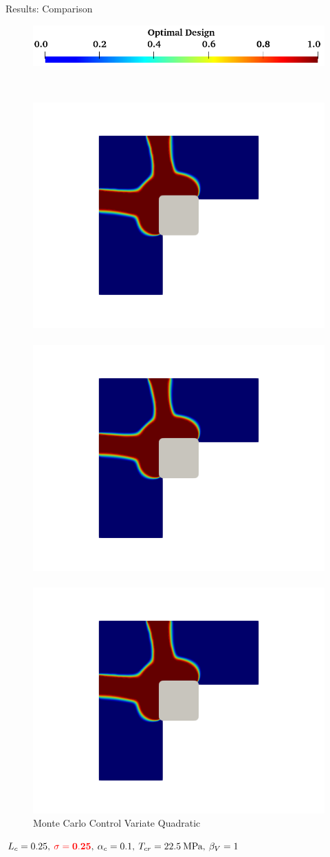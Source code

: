 \documentclass[10pt,xcolor=dvipsnames,compress]{beamer}
\begin{document}
\begin{frame}{Results: Comparison}
\begin{figure}
        \centering
        \includegraphics[width=0.35\linewidth]{Figures/design_contour_2.png}
    \end{figure}
    \vspace{-0.1in}\\
    \begin{figure}
        \centering
        \footnotesize
        \includegraphics[trim={3.6in 1.8in 3.5in 2.5in},clip,width=0.25\linewidth]{Figures/LU1.png}\hspace{0.1in}~
        \includegraphics[trim={3.6in 1.8in 3.5in 2.5in},clip,width=0.25\linewidth]{Figures/LU2.png}\hspace{0.1in}~
        \includegraphics[trim={3.6in 1.8in 3.5in 2.5in},clip,width=0.25\linewidth]{Figures/LU3.png}\\
        \footnotesize{Monte Carlo \hspace{0.6 in} { Control Variate} \hspace{0.6 in} Quadratic } \vspace{0.1 in}\\
        \label{fig:enter-label}
    \end{figure}
    \centering
    $L_c = 0.25, \: {\color{red}\bf \sigma= 0.25},\: \alpha_c = 0.1, \:T_{cr} = 22.5 \:\text{MPa},\: \beta_{V} = 1$
\end{frame}
\end{document}
